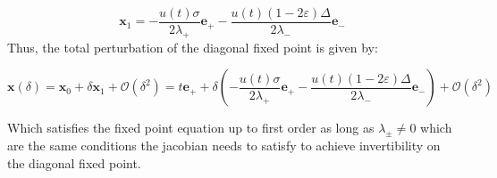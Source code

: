 \begin{equation}
	\symbf{x}_1 = -\frac{u(t)\sigma}{2\lambda_+} \symbf{e}_+ - \frac{u(t)(1-2\varepsilon)\Delta}{2\lambda_-}\symbf{e}_-
\end{equation}
Thus, the total perturbation of the diagonal fixed point is given by:

\begin{equation}
	\symbf{x}(\delta) = \symbf{x}_0 + \delta \symbf{x}_1 + \mathcal{O}(\delta^2) =  t\symbf{e}_+ + \delta \left(-\frac{u(t)\sigma}{2\lambda_+} \symbf{e}_+ - \frac{u(t)(1-2\varepsilon)\Delta}{2\lambda_-}\symbf{e}_-\right ) + \mathcal{O}(\delta^2)
\end{equation}

Which satisfies the fixed point equation up to first order as long as $\lambda_\pm \neq 0$ which are the same conditions the 
jacobian needs to satisfy to achieve invertibility on the diagonal fixed point.

\newpage



